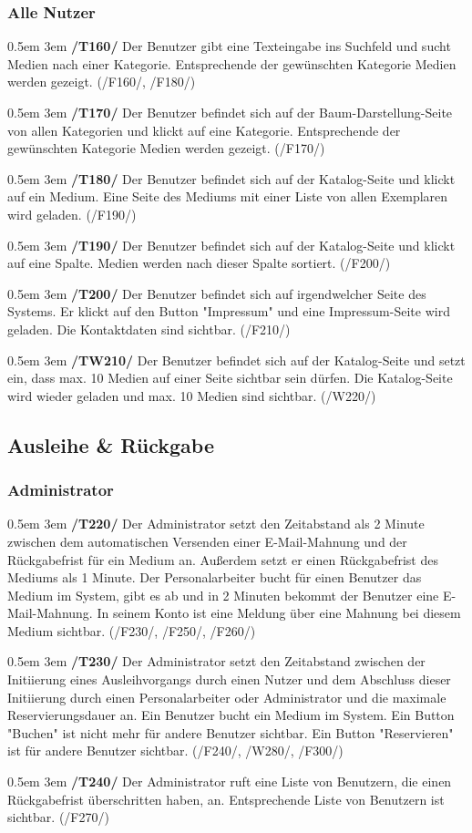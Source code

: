 \documentclass{article}
\newcommand{\specification}[3]{
	{\parindent 0.5em \hangindent 3em \hypertarget{spec:#1:#2}{\textbf{/#1#2/}} #3 \par \nobreak \vspace*{0.5em}}
}
\begin{document}
		\subsubsection{Alle Nutzer}
			\specification{T}{160}{Der Benutzer gibt eine Texteingabe ins Suchfeld und sucht Medien nach einer Kategorie. Entsprechende der gewünschten Kategorie Medien werden gezeigt. (/F160/, /F180/) }
			\specification{T}{170}{Der Benutzer befindet sich auf der Baum-Darstellung-Seite von allen Kategorien und klickt auf eine Kategorie. Entsprechende der gewünschten Kategorie Medien werden gezeigt. (/F170/) }
			\specification{T}{180}{Der Benutzer befindet sich auf der Katalog-Seite und klickt auf ein Medium. Eine Seite des Mediums mit einer Liste von allen Exemplaren wird geladen. (/F190/) }
			\specification{T}{190}{Der Benutzer befindet sich auf der Katalog-Seite und klickt auf eine Spalte. Medien werden nach dieser Spalte sortiert. (/F200/) }
			\specification{T}{200}{Der Benutzer befindet sich auf irgendwelcher Seite des Systems. Er klickt auf den Button "Impressum" und eine Impressum-Seite wird geladen. Die Kontaktdaten sind sichtbar. (/F210/) }
			\specification{TW}{210}{Der Benutzer befindet sich auf der Katalog-Seite und setzt ein, dass max. 10 Medien auf einer Seite sichtbar sein dürfen. Die Katalog-Seite wird wieder geladen und max. 10 Medien sind sichtbar. (/W220/)}
			\subsection{Ausleihe \& Rückgabe}
		\subsubsection{Administrator}
			\specification{T}{220}{Der Administrator setzt den Zeitabstand als 2 Minute zwischen dem automatischen Versenden einer E-Mail-Mahnung und der Rückgabefrist für ein Medium an. Außerdem setzt er einen Rückgabefrist des Mediums als 1 Minute. Der Personalarbeiter bucht für einen Benutzer das Medium im System, gibt es ab und in 2 Minuten bekommt der Benutzer eine E-Mail-Mahnung. In seinem Konto ist eine Meldung über eine Mahnung bei diesem Medium sichtbar. (/F230/, /F250/, /F260/)}
			\specification{T}{230}{Der Administrator setzt den Zeitabstand zwischen der Initiierung eines Ausleihvorgangs durch einen Nutzer und dem Abschluss dieser Initiierung durch einen Personalarbeiter oder Administrator und die maximale Reservierungsdauer an. Ein Benutzer bucht ein Medium im System. Ein Button "Buchen" ist nicht mehr für andere Benutzer sichtbar. Ein Button "Reservieren" ist für andere Benutzer sichtbar. (/F240/, /W280/, /F300/)}
			\specification{T}{240}{Der Administrator ruft eine Liste von Benutzern, die einen Rückgabefrist überschritten haben, an. Entsprechende Liste von Benutzern ist sichtbar. (/F270/)}
\end{document}
